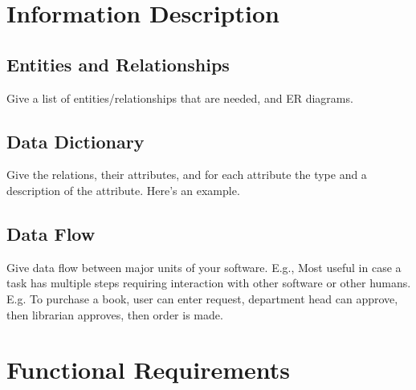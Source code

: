 \documentclass[a4wide]{article}
\begin{document}
\section{Information Description}

\subsection{Entities and Relationships}

Give a list of entities/relationships that are needed,
and ER diagrams.

\subsection{Data Dictionary}

Give the relations, their attributes, and for each attribute the
type and a description of the attribute.  Here's an example.


\subsection{Data Flow}

Give data flow between major units of your software.
E.g.,
Most useful in case a task has multiple steps requiring interaction
with other software or other humans.
E.g. To purchase a book, user can enter request, department head can
approve, then librarian approves, then order is made.

\section{Functional Requirements}
\end{document}
